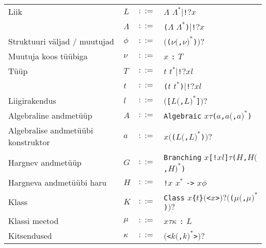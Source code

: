 \documentclass[12pt]{article}
\begin{document}
    \begin{tabular}{llll}
      Liik & $L$ & $::=$ & $\Lambda$ $\Lambda^*|${\color{helehall}\verb"!"}$?x$ \\
       & $\Lambda$ & $::=$ & {\color{helehall}\verb!(!}$\Lambda$ $\Lambda^*${\color{helehall}\verb!)!}$|${\color{helehall}\verb"!"}$?x$ \\
      Struktuuri väljad / muutujad & $\phi$ & $::=$ & $(${\color{helehall}\verb!(!}$\nu(${\color{helehall}\verb!,!}$\nu)^*${\color{helehall}\verb!)!}$)?$ \\
      Muutuja koos tüübiga & $\nu$ & $::=$ & $x$ {\color{helehall}\verb!:!} $T$ \\
      Tüüp & $T$ & $::=$ & $t$ $t^*|${\color{helehall}\verb"!"}$?xl$ \\
       & $t$ & $::=$ & {\color{helehall}\verb!(!}$t$ $t^*${\color{helehall}\verb!)!}$|${\color{helehall}\verb"!"}$?xl$ \\
      Liigirakendus & $l$ & $::=$ & $(${\color{helehall}\verb"["}$L(${\color{helehall}\verb","}$L)^*${\color{helehall}\verb"]"}$)?$ \\
      Algebraline andmetüüp & $A$ & $::=$ & {\color{helehall}\verb!Algebraic!} $x\tau${\color{helehall}\verb!(!}$a${\color{helehall}\verb!,!}$a(${\color{helehall}\verb!,!}$a)^*${\color{helehall}\verb!)!} \\
      Algebralise andmetüübi konstruktor & $a$ & $::=$ & $x(${\color{helehall}\verb!(!}$L(${\color{helehall}\verb!,!}$L)^*${\color{helehall}\verb!)!}$)?$ \\
      Hargnev andmetüüp & $G$ & $::=$ & {\color{helehall}\verb!Branching!} $x${\color{helehall}\verb"[!"}$xl${\color{helehall}\verb!]!}$\tau${\color{helehall}\verb!(!}$H${\color{helehall}\verb!,!}$H(${\color{helehall}\verb!,!}$H)^*${\color{helehall}\verb!)!} \\
      Hargneva andmetüübi haru & $H$ & $::=$ & {\color{helehall}\verb"!"}$x$ $x^*$ {\color{helehall}\verb!->!} $x\phi$ \\
      Klass & $K$ & $::=$ & {\color{helehall}\verb!Class!} $x${\color{helehall}\verb!{!}$t${\color{helehall}\verb!}!}$(${\color{helehall}\verb!<!}$x${\color{helehall}\verb!>!}$)?(${\color{helehall}\verb!(!}$\mu(${\color{helehall}\verb!,!}$\mu)^*${\color{helehall}\verb!)!}$)?$ \\
      Klassi meetod & $\mu$ & $::=$ & $x\tau\kappa$ {\color{helehall}\verb!:!} $L$ \\
      Kitsendused & $\kappa$ & $::=$ & $(${\color{helehall}\verb!<!}$k(${\color{helehall}\verb!,!}$k)^*${\color{helehall}\verb!>!}$)?$ \\

\end{tabular}
\end{document}
